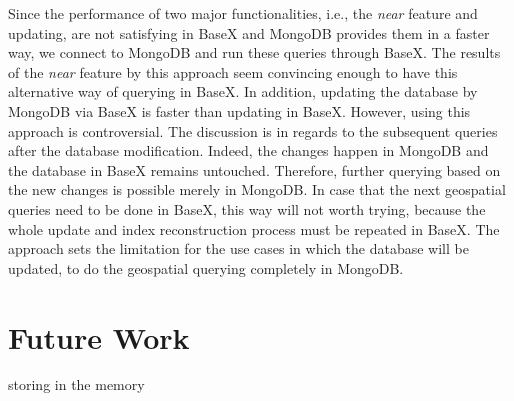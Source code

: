 \documentclass[a4paper,12pt]{article}
\begin{document}
Since the performance of two major functionalities, i.e., the \textit{near} feature and updating, are not satisfying in BaseX and MongoDB provides them in a faster way, we connect to MongoDB and run these queries through BaseX. The results of the \textit{near} feature by this approach seem convincing enough to have this alternative way of querying in BaseX. In addition, updating the database by MongoDB via BaseX is faster than updating in BaseX. However, using this approach is controversial. The discussion is in regards to the subsequent queries after the database modification. Indeed, the changes happen in MongoDB and the database in BaseX remains untouched. Therefore, further querying based on the new changes is possible merely in MongoDB. In case that the next geospatial queries need to be done in BaseX, this way will not worth trying, because the whole update and index reconstruction process must be repeated in BaseX. The approach sets the limitation for the use cases in which the database will be updated, to do the geospatial querying completely in MongoDB.


\newpage
\section{Future Work}
\label{s.future}
storing in the memory
\newpage


\newpage
\listoffigures
\newpage
\listoftables
\newpage
\lstlistoflistings
\end{document}
